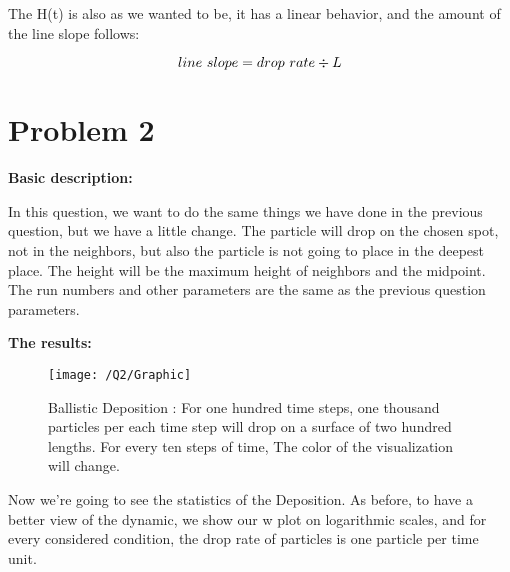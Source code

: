 \documentclass{article}
\begin{document}
    The H(t) is also as we wanted to be, it has a linear behavior,
    and the amount of the line slope follows:

    \begin{equation}
        \centering
        line \ slope = drop \ rate \div L
    \end{equation}

    \section*{Problem 2}
    \textbf{Basic description:}

    In this question, we want to do the same things we have done in the previous question,
    but we have a little change. The particle will drop on the chosen spot,
    not in the neighbors, but also the particle is not going to place in the deepest place.
    The height will be the maximum height of neighbors and the midpoint.
    The run numbers and other parameters are the same as the previous question parameters.

    \textbf{The results:}

    \begin{figure}[!htb]
        \centering
        \texttt{[image: /Q2/Graphic]}
        \label{fig:2.1}
        \caption{Ballistic Deposition :
        For one hundred time steps, one thousand particles per each time step will drop on a surface of two hundred lengths.
        For every ten steps of time, The color of the visualization will change.}
    \end{figure}

    Now we're going to see the statistics of the Deposition.
    As before, to have a better view of the dynamic,
    we show our w plot on logarithmic scales,
    and for every considered condition,
    the drop rate of particles is one particle per time unit.
\end{document}

